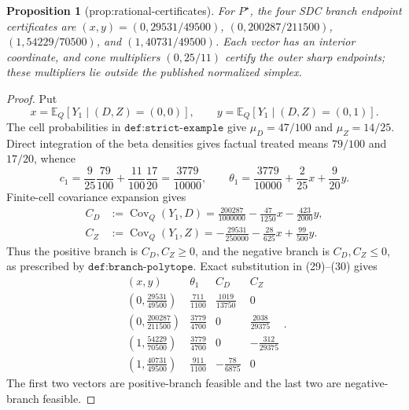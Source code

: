 \documentclass{article}
\newtheorem{proposition}{Proposition}
\begin{document}
\begin{proposition}[prop:rational-certificates]\label{prop:rational-certificates}
For \(P^\star\), the four SDC branch endpoint certificates are \((x,y)=(0,29531/49500)\), \((0,200287/211500)\), \((1,54229/70500)\), and \((1,40731/49500)\). Each vector has an interior coordinate, and cone multipliers \((0,25/11)\) certify the outer sharp endpoints; these multipliers lie outside the published normalized simplex.
\end{proposition}
\begin{proof}
Put
\[
 x=\mathbb E_Q[Y_1\mid(D,Z)=(0,0)],\qquad
 y=\mathbb E_Q[Y_1\mid(D,Z)=(0,1)].
\]
The cell probabilities in \(\texttt{def:strict-example}\) give \(\mu_D=47/100\) and \(\mu_Z=14/25\).  Direct integration of the beta densities gives factual treated means \(79/100\) and \(17/20\), whence
\[
 c_1=\frac{9}{25}\frac{79}{100}+\frac{11}{100}\frac{17}{20}
 =\frac{3779}{10000},
 \qquad
 \theta_1=\frac{3779}{10000}+\frac{2}{25}x+\frac{9}{20}y.                    \tag{29}
\]
Finite-cell covariance expansion gives
\[
 \begin{aligned}
 C_D&:=\operatorname{Cov}_Q(Y_1,D)
 =\frac{200287}{1000000}-\frac{47}{1250}x-\frac{423}{2000}y,\\
 C_Z&:=\operatorname{Cov}_Q(Y_1,Z)
 =-\frac{29531}{250000}-\frac{28}{625}x+\frac{99}{500}y.
 \end{aligned}                                                               \tag{30}
\]
Thus the positive branch is \(C_D,C_Z\ge0\), and the negative branch is \(C_D,C_Z\le0\), as prescribed by \(\texttt{def:branch-polytope}\).  Exact substitution in (29)--(30) gives
\[
\begin{array}{c|c|c|c}
(x,y)&\theta_1&C_D&C_Z\\ \hline
\left(0,\frac{29531}{49500}\right)&\frac{711}{1100}&\frac{1019}{13750}&0\\[2pt]
\left(0,\frac{200287}{211500}\right)&\frac{3779}{4700}&0&\frac{2038}{29375}\\[2pt]
\left(1,\frac{54229}{70500}\right)&\frac{3779}{4700}&0&-\frac{312}{29375}\\[2pt]
\left(1,\frac{40731}{49500}\right)&\frac{911}{1100}&-\frac{78}{6875}&0
\end{array}.                                                                  \tag{31}
\]
The first two vectors are positive-branch feasible and the last two are negative-branch feasible.


\end{proof}
\end{document}

